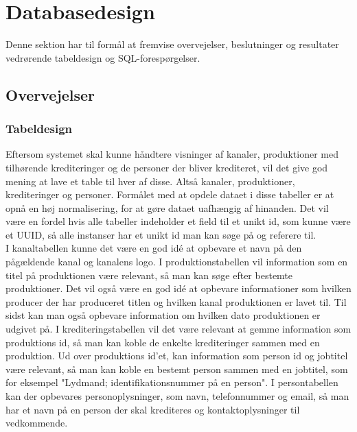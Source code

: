 \section{Databasedesign}
Denne sektion har til formål at fremvise overvejelser, beslutninger og resultater vedrørende tabeldesign og SQL-forespørgelser.

\subsection{Overvejelser}
\subsubsection{Tabeldesign}
Eftersom systemet skal kunne håndtere visninger af kanaler, produktioner med tilhørende krediteringer og de personer der bliver krediteret, vil det give god mening at lave et table til hver af disse. Altså kanaler, produktioner, krediteringer og personer. Formålet med at opdele dataet i disse tabeller er at opnå en høj normalisering, for at gøre dataet uafhængig af hinanden. Det vil være en fordel hvis alle tabeller indeholder et field til et unikt id, som kunne være et UUID, så alle instanser har et unikt id man kan søge på og referere til. \\ 

\noindent
I kanaltabellen kunne det være en god idé at opbevare et navn på den pågældende kanal og kanalens logo. I produktionstabellen vil information som en titel på produktionen være relevant, så man kan søge efter bestemte produktioner. Det vil også være en god idé at opbevare informationer som hvilken producer der har produceret titlen og hvilken kanal produktionen er lavet til. Til sidst kan man også opbevare information om hvilken dato produktionen er udgivet på. I krediteringstabellen vil det være relevant at gemme information som produktions id, så man kan koble de enkelte krediteringer sammen med en produktion. Ud over produktions id'et, kan information som person id og jobtitel være relevant, så man kan koble en bestemt person sammen med en jobtitel, som for eksempel "Lydmand; identifikationsnummer på en person". I persontabellen kan der opbevares personoplysninger, som navn, telefonnummer og email, så man har et navn på en person der skal krediteres og kontaktoplysninger til vedkommende. \\

